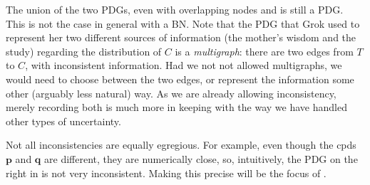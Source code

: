 \documentclass{article}
\theoremstyle{plain}
\theoremstyle{definition}
\newenvironment{example}
	{\pushQED{\qed}\renewcommand{\qedsymbol}{$\triangle$}\examplex}
	{\popQED\endexamplex%
}
\theoremstyle{remark}
\newcommand\mat[1]{\mathbf{#1}}
\newcommand{\dg}[1]{\mathfrak{#1}}
\newcommand{\MN}{PDG}
\numberwithin{equation}{section}
\begin{document}
\begin{example}
		The union of the two PDGs, even with overlapping nodes
                and is still a PDG. This is not the case 
                in general with a BN. Note that the PDG that Grok used
                to          represent her two 
                different sources of information (the mother's wisdom
                and the study) regarding the distribution of
               $C$ is a \emph{multigraph}: there are two 
                edges from $T$ to $C$, with inconsistent information.
                Had we not not allowed multigraphs, we would need to
                choose between the two edges, or represent the
                information some other (arguably less natural) way.
                As we are already allowing inconsistency,
                merely recording both is much more in keeping with the
                way we have handled other types of uncertainty. 
	\end{example}

Not all inconsistencies are equally egregious.
For example,
even though the cpds $\mat p$ and $\mat q$ are different, they
are numerically close, so, intuitively, the PDG on the right in
 is not very inconsistent.  
Making this precise will be the focus of	
.
\end{document}
